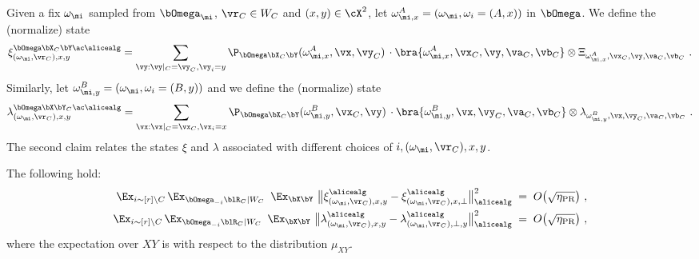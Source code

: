 Given a fix $\omega_{\mi}$ sampled from $\bOmega_{\mi}$, $\vr_C \in W_C$ and $(x,y) \in \cX^2$, let $\omega_{\mi,x}^{A} = (\omega_{\mi}, \omega_{i} = (A,x) )$ in $\bOmega$. We define the (normalize) state
\begin{equation} \label{eq:xidefcondoni}
	\xi^{\bOmega \bX_C \bY \ac \alicealg}_{(\omega_\mi, \vr_C), x,y} = \sum_{\vy: \vy|_{C} = \vy_C,  \vy_i = y} \P_{\bOmega \bX_C \bY} ( \omega_{\mi,x}^{A},\vx, \vy_C) \,  \cdot \bra{\omega_{\mi,x}^{A}, \vx_C, \vy, \va_C, \vb_C} \otimes \Xi_{\omega_{\mi,x}^{A},\vx_C, \vy,\va_C,\vb_C} ~.   \\
\end{equation}
Similarly, let $\omega_{\mi,y}^{B} = (\omega_{\mi}, \omega_{i} = (B,y))$ and we define the (normalize) state
\begin{equation*}
	\lambda^{\bOmega \bX \bY_C \ac \alicealg}_{(\omega_\mi, \vr_C), x,y} = \sum_{\vx: \vx|_{C} = \vx_C,  \vx_i = x} \P_{\bOmega \bX_C \bY} ( \omega_{\mi,y}^{B},\vx_C, \vy) \,  \cdot \bra{\omega_{\mi,y}^{B}, \vx, \vy_C, \va_C, \vb_C} \otimes \lambda_{\omega_{\mi,y}^{B},\vx, \vy_C,\va_C,\vb_C} ~.  \\
\end{equation*}
The second claim relates the states $\xi$ and $\lambda$ associated with different choices of $i,(\omega_{\mi}, \vr_C),x,y$. 
\begin{claim}\label{claim:xi-change-y}
	The following hold:
	\begin{align}
		\Ex_{i \sim [r] \setminus C} \, \Ex_{\bOmega_{-i} \blR_C |  W_C} \, \, \, \Ex_{\bX \bY} \,\, \big \| \xi^{\alicealg}_{(\omega_\mi, \vr_C), x,y} - \xi^{\alicealg}_{(\omega_\mi, \vr_C), x,\bot} \big \|_\alicealg^2\; &= \; O\big(\sqrt{\eta_{\text{PR}}} \big)~, \label{eq:E_A_1} \\
		\Ex_{i \sim [r] \setminus C} \, \Ex_{\bOmega_{-i} \blR_C |  W_C}   \, \, \, \Ex_{\bX \bY} \,\, \big \| \lambda^{\alicealg}_{(\omega_\mi, \vr_C), x,y} - \lambda^{\alicealg}_{(\omega_\mi, \vr_C), \bot,y} \big \|_\alicealg^2\; &= \; O\big(\sqrt{\eta_{\text{PR}}} \big)~, \label{eq:E_A_2}
	\end{align}
	where the expectation over $XY$ is with respect to the distribution $\mu_{XY}$. 
\end{claim}

